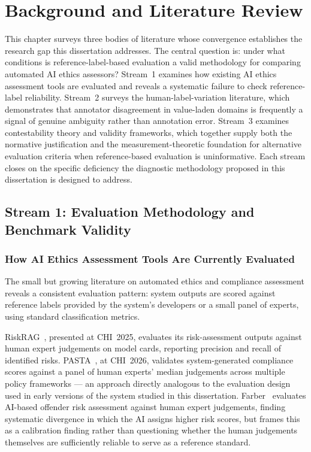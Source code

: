 \chapter{Background and Literature Review}
\label{ch:background}

This chapter surveys three bodies of literature whose convergence establishes
the research gap this dissertation addresses.  The central question is: under
what conditions is reference-label-based evaluation a valid methodology for
comparing automated AI ethics assessors?  Stream~1 examines how existing AI
ethics assessment tools are evaluated and reveals a systematic failure to
check reference-label reliability.  Stream~2 surveys the human-label-variation
literature, which demonstrates that annotator disagreement in value-laden
domains is frequently a signal of genuine ambiguity rather than annotation
error.  Stream~3 examines contestability theory and validity frameworks,
which together supply both the normative justification and the
measurement-theoretic foundation for alternative evaluation criteria when
reference-based evaluation is uninformative.  Each stream closes on the
specific deficiency the diagnostic methodology proposed in this dissertation
is designed to address.

\section{Stream 1: Evaluation Methodology and Benchmark Validity}

\subsection{How AI Ethics Assessment Tools Are Currently Evaluated}

The small but growing literature on automated ethics and compliance
assessment reveals a consistent evaluation pattern: system outputs are
scored against reference labels provided by the system's developers or a
small panel of experts, using standard classification metrics.

RiskRAG~\cite{riskrag2025}, presented at CHI~2025, evaluates its
risk-assessment outputs against human expert judgements on model cards,
reporting precision and recall of identified risks.  PASTA~\cite{pasta2026},
at CHI~2026, validates system-generated compliance scores against a panel of
human experts' median judgements across multiple policy frameworks --- an
approach directly analogous to the evaluation design used in early versions of
the system studied in this dissertation.  Farber~\cite{farber2025} evaluates
AI-based offender risk assessment against human expert judgements, finding
systematic divergence in which the AI assigns higher risk scores, but frames
this as a calibration finding rather than questioning whether the human
judgements themselves are sufficiently reliable to serve as a reference
standard.

